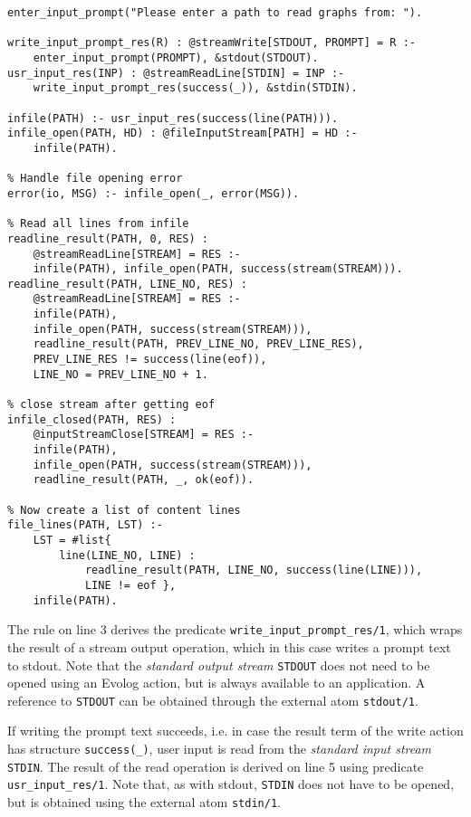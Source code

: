\begin{lstlisting}[style=asp-code, label={lst:results-xml-graphcol-userinput}, caption={Reading a file based on user input.}] 
enter_input_prompt("Please enter a path to read graphs from: ").

write_input_prompt_res(R) : @streamWrite[STDOUT, PROMPT] = R :- 
    enter_input_prompt(PROMPT), &stdout(STDOUT).
usr_input_res(INP) : @streamReadLine[STDIN] = INP :- 
    write_input_prompt_res(success(_)), &stdin(STDIN).

infile(PATH) :- usr_input_res(success(line(PATH))).
infile_open(PATH, HD) : @fileInputStream[PATH] = HD :- 
    infile(PATH).

% Handle file opening error
error(io, MSG) :- infile_open(_, error(MSG)).

% Read all lines from infile 
readline_result(PATH, 0, RES) : 
    @streamReadLine[STREAM] = RES :- 
    infile(PATH), infile_open(PATH, success(stream(STREAM))).
readline_result(PATH, LINE_NO, RES) : 
    @streamReadLine[STREAM] = RES :- 
    infile(PATH), 
    infile_open(PATH, success(stream(STREAM))), 
    readline_result(PATH, PREV_LINE_NO, PREV_LINE_RES), 
    PREV_LINE_RES != success(line(eof)), 
    LINE_NO = PREV_LINE_NO + 1.

% close stream after getting eof
infile_closed(PATH, RES) : 
    @inputStreamClose[STREAM] = RES :- 
    infile(PATH), 
    infile_open(PATH, success(stream(STREAM))),
    readline_result(PATH, _, ok(eof)).

% Now create a list of content lines
file_lines(PATH, LST) :- 
    LST = #list{ 
        line(LINE_NO, LINE) : 
            readline_result(PATH, LINE_NO, success(line(LINE))), 
            LINE != eof },
    infile(PATH). 
\end{lstlisting}    

The rule on line 3 derives the predicate \texttt{write\_input\_prompt\_res/1}, which wraps the result of a stream output operation, which in this case writes a prompt text to stdout. Note that the \emph{standard output stream} \texttt{STDOUT} does not need to be opened using an Evolog action, but is always available to an application. A reference to \texttt{STDOUT} can be obtained through the external atom \texttt{stdout/1}.

If writing the prompt text succeeds, i.e. in case the result term of the write action has structure \texttt{success(\_)}, user input is read from the \emph{standard input stream} \texttt{STDIN}. The result of the read operation is derived on line 5 using  predicate \texttt{usr\_input\_res/1}. Note that, as with stdout, \texttt{STDIN} does not have to be opened, but is obtained using the external atom \texttt{stdin/1}.

